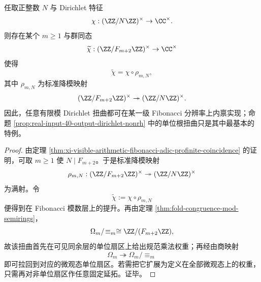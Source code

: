 \begin{corollary}\label{cor:xi-time-part62da-dirichlet-twists-intrinsic-on-fibonacci-levels}
任取正整数 \(N\) 与 Dirichlet 特征
\[
\chi:(\ZZ/N\ZZ)^\times\to \CC^\times.
\]
则存在某个 \(m\ge 1\) 与群同态
\[
\widetilde\chi:(\ZZ/F_{m+2}\ZZ)^\times\to \CC^\times
\]
使得
\[
\widetilde\chi=\chi\circ \rho_{m,N},
\]
其中 \(\rho_{m,N}\) 为标准降模映射
\[
(\ZZ/F_{m+2}\ZZ)^\times\twoheadrightarrow (\ZZ/N\ZZ)^\times.
\]
因此，任意有限模 Dirichlet 扭曲都可在某一级 Fibonacci 分辨率上内禀实现；命题 \ref{prop:real-input-40-output-dirichlet-nonrh} 中的单位根扭曲只是其中最基本的特例。
\end{corollary}
\begin{proof}
由定理 \ref{thm:xi-visible-arithmetic-fibonacci-adic-profinite-coincidence} 的证明，可取 \(m\ge 1\) 使 \(N\mid F_{m+2}\)。于是标准降模映射
\[
\rho_{m,N}:(\ZZ/F_{m+2}\ZZ)^\times\twoheadrightarrow (\ZZ/N\ZZ)^\times
\]
为满射。令
\[
\widetilde\chi:=\chi\circ \rho_{m,N}
\]
便得到在 Fibonacci 模数层上的提升。再由定理 \ref{thm:fold-congruence-mod-semirings}，
\[
\Omega_m/\!\equiv_m\cong \ZZ/(F_{m+2}\ZZ),
\]
故该扭曲首先在可见同余层的单位扇区上给出规范乘法权重；再经由商映射
\[
\Omega_m\twoheadrightarrow \Omega_m/\!\equiv_m
\]
即可拉回到对应的微观态单位扇区。若需把它扩展为定义在全部微观态上的权重，只需再对非单位扇区作任意固定延拓。证毕。
\end{proof}

